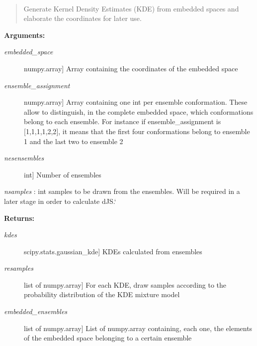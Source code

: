 \documentclass[letterpaper,10pt,english]{sphinxmanual}
\begin{document}

\begin{fulllineitems}
\label{index:encore.similarity.gen_kde_pdfs}~\begin{quote}

Generate Kernel Density Estimates (KDE) from embedded spaces and elaborate the coordinates for later use.
\end{quote}

\textbf{Arguments:}
\begin{description}
\item[{\emph{embedded\_space}}] \leavevmode{[}numpy.array{]}
Array containing the coordinates of the embedded space

\item[{\emph{ensemble\_assignment}}] \leavevmode{[}numpy.array{]}
Array containing one int per ensemble conformation. These allow to distinguish, in the complete embedded space, which conformations belong to each ensemble. For instance if ensemble\_assignment is {[}1,1,1,1,2,2{]}, it means that the first four conformations belong to ensemble 1 and the last two to ensemble 2

\item[{\emph{nesensembles}}] \leavevmode{[}int{]}
Number of ensembles

\end{description}

\emph{nsamples} : int samples to be drawn from the ensembles. Will be required in a later stage in order to calculate dJS.{}`

\textbf{Returns:}
\begin{description}
\item[{\emph{kdes}}] \leavevmode{[}scipy.stats.gaussian\_kde{]}
KDEs calculated from ensembles

\item[{\emph{resamples}}] \leavevmode{[}list of numpy.array{]}
For each KDE, draw samples according to the probability distribution of the KDE mixture model

\item[{\emph{embedded\_ensembles}}] \leavevmode{[}list of numpy.array{]}
List of numpy.array containing, each one, the elements of the embedded space belonging to a certain ensemble

\end{description}

\end{fulllineitems}
\end{document}
